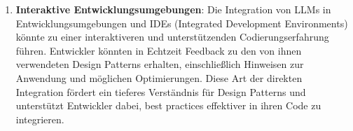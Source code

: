 \begin{enumerate}
    \item \textbf{Interaktive Entwicklungsumgebungen}: Die Integration von LLMs in Entwicklungsumgebungen und IDEs (Integrated Development Environments) könnte zu einer interaktiveren und unterstützenden Codierungserfahrung führen. Entwickler könnten in Echtzeit Feedback zu den von ihnen verwendeten Design Patterns erhalten, einschließlich Hinweisen zur Anwendung und möglichen Optimierungen. Diese Art der direkten Integration fördert ein tieferes Verständnis für Design Patterns und unterstützt Entwickler dabei, best practices effektiver in ihren Code zu integrieren.
\end{enumerate}
